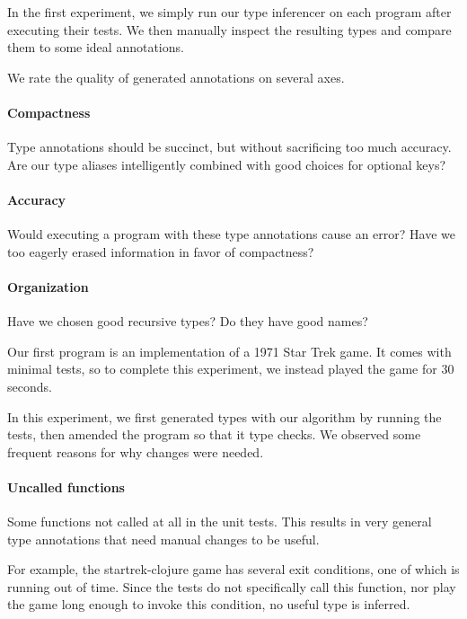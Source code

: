 
In the first experiment, we simply run our 
type inferencer on each program after executing
their tests.
We then manually inspect the resulting
types and compare them to some ideal
annotations.

We rate the quality of generated annotations
on several axes.

\paragraph{Compactness} Type annotations should be succinct,
        but without sacrificing too much accuracy.
        Are our type aliases intelligently combined
        with good choices for optional keys?

  \paragraph{Accuracy} Would executing a program with these
      type annotations cause an error?
      Have we too eagerly erased information in favor
      of compactness?

  \paragraph{Organization} Have we chosen good recursive types?
      Do they have good names?

Our first program is an implementation of a
1971 Star Trek game.
It comes with minimal tests, so to complete this experiment,
we instead played the game for 30 seconds.


In this experiment, we first generated types with our algorithm
by running the tests, then amended the program so that it
type checks.
We observed some frequent reasons for why changes were needed.

\paragraph{Uncalled functions}
Some functions not called at all in the unit tests.
This results in very general type annotations that need
manual changes to be useful.

For example, the startrek-clojure game has several exit
conditions, one of which is running out of time.
Since the tests do not specifically call this function,
nor play the game long enough to invoke this condition,
no useful type is inferred.

